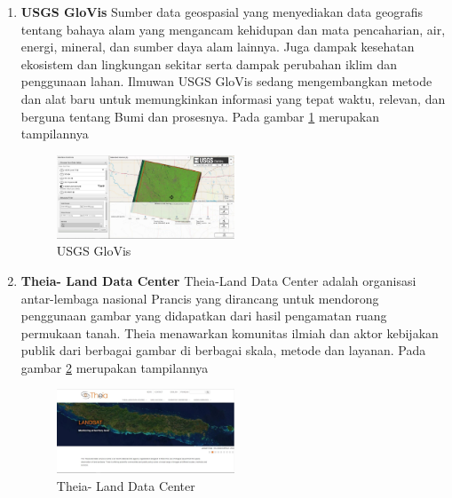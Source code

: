 \begin{enumerate}
\item \textbf{USGS GloVis}
\subitem Sumber data geospasial yang menyediakan data geografis tentang bahaya alam yang mengancam kehidupan dan mata pencaharian, air, energi, mineral, dan sumber daya alam lainnya. Juga dampak kesehatan ekosistem dan lingkungan sekitar serta dampak perubahan iklim dan penggunaan lahan. Ilmuwan USGS GloVis sedang mengembangkan metode dan alat baru untuk memungkinkan informasi yang tepat waktu, relevan, dan berguna tentang Bumi dan prosesnya.  Pada gambar \ref{labelgambar6} merupakan tampilannya  

\begin{figure}[ht]
\centering
\includegraphics[width=0.5\textwidth]{pictures/USGS_GloVis}
\caption{USGS GloVis}
\label{labelgambar6}
\end{figure}

\item \textbf{Theia- Land Data Center}
\subitem Theia-Land Data Center adalah organisasi antar-lembaga nasional Prancis yang dirancang untuk mendorong penggunaan gambar yang didapatkan dari hasil pengamatan ruang permukaan tanah. Theia menawarkan komunitas ilmiah dan aktor kebijakan publik dari berbagai gambar di berbagai skala, metode dan layanan.  Pada gambar \ref{labelgambar7} merupakan tampilannya  
\begin{figure}[ht]
\centering
\includegraphics[width=0.5\textwidth]{pictures/Theia_Land_Data_Center}
\caption{Theia- Land Data Center}
\label{labelgambar7}
\end{figure}
\end{enumerate}